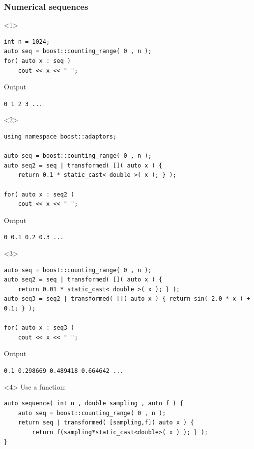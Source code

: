 \documentclass{beamer}
\newcommand{\heading}[1]{\frametitle{#1}}
\begin{document}
\begin{frame}[fragile]
 \heading{Numerical sequences}
 
 \begin{onlyenv}<1>
\begin{lstlisting}[basicstyle=\scriptsize\ttfamily]
int n = 1024;
auto seq = boost::counting_range( 0 , n );
for( auto x : seq )
    cout << x << " ";
\end{lstlisting}
\vspace{2ex}Output

\vspace{0.5ex}\lstinline$0 1 2 3 ...$
 \end{onlyenv}
  \begin{onlyenv}<2>
\begin{lstlisting}[basicstyle=\scriptsize\ttfamily]
using namespace boost::adaptors;

auto seq = boost::counting_range( 0 , n );
auto seq2 = seq | transformed( []( auto x ) {
    return 0.1 * static_cast< double >( x ); } );

for( auto x : seq2 )
    cout << x << " ";
\end{lstlisting}
\vspace{2ex}Output

\vspace{0.5ex}\lstinline$0 0.1 0.2 0.3 ...$
 \end{onlyenv}
  \begin{onlyenv}<3>
\begin{lstlisting}[basicstyle=\scriptsize\ttfamily]
auto seq = boost::counting_range( 0 , n );
auto seq2 = seq | transformed( []( auto x ) {
    return 0.01 * static_cast< double >( x ); } );
auto seq3 = seq2 | transformed( []( auto x ) { return sin( 2.0 * x ) + 0.1; } );

for( auto x : seq3 )
    cout << x << " ";
\end{lstlisting}
\vspace{2ex}Output

\vspace{0.5ex}\lstinline$0.1 0.298669 0.489418 0.664642 ...$
 \end{onlyenv}
  \begin{onlyenv}<4>
Use a function:
\begin{lstlisting}[basicstyle=\scriptsize\ttfamily]
auto sequence( int n , double sampling , auto f ) {
    auto seq = boost::counting_range( 0 , n );
    return seq | transformed( [sampling,f]( auto x ) { 
        return f(sampling*static_cast<double>( x ) ); } );
}


\end{lstlisting}
\end{onlyenv}
\end{frame}
\end{document}
